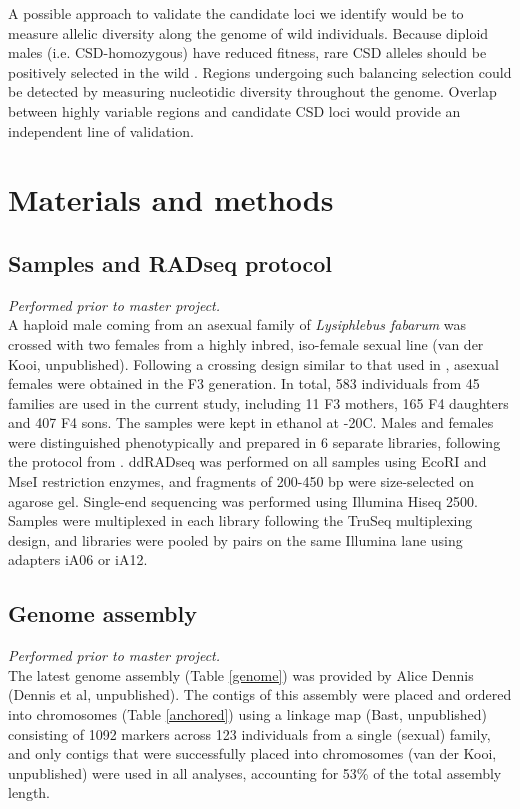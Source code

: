 \documentclass[11pt,a4paper]{report}
\begin{document}
A possible approach to validate the candidate loci we identify would be to measure allelic diversity along the genome of wild individuals. Because diploid males (i.e. CSD-homozygous) have reduced fitness, rare CSD alleles should be positively selected in the wild \citep{Hasselmann2004SignaturesBee., Gloag2016}. Regions undergoing such balancing selection could be detected by measuring nucleotidic diversity throughout the genome. Overlap between highly variable regions and candidate CSD loci would provide an independent line of validation. 

\section{Materials and methods}

\subsection{Samples and RADseq protocol}
\textit{Performed prior to master project.}\\
A haploid male coming from an asexual family of \textit{Lysiphlebus fabarum} was crossed with two females from a highly inbred, iso-female sexual line (van der Kooi, unpublished). Following a crossing design similar to that used in \citet{Sandrock2011}, asexual females were obtained in the F3 generation. In total, 583 individuals from 45 families are used in the current study, including 11 F3 mothers, 165 F4 daughters and 407 F4 sons. The samples were kept in ethanol at -20\degree C. Males and females were distinguished phenotypically and prepared in 6 separate libraries, following the protocol from \citet{Parchman2012Genome-widePine}. ddRADseq was performed on all samples using EcoRI and MseI restriction enzymes, and fragments  of 200-450 bp were size-selected on agarose gel. Single-end sequencing was performed using Illumina Hiseq 2500. Samples were multiplexed in each library following the TruSeq multiplexing design, and libraries were pooled by pairs on the same Illumina lane using adapters iA06 or iA12.

\subsection{Genome assembly}
\textit{Performed prior to master project.}\\
The latest genome assembly (Table \ref{genome}) was provided by Alice Dennis (Dennis et al, unpublished). The contigs of this assembly were placed and ordered into chromosomes (Table \ref{anchored}) using a linkage map (Bast, unpublished) consisting of 1092 markers across 123 individuals from a single (sexual) family, and only contigs that were successfully placed into chromosomes (van der Kooi, unpublished) were used in all analyses, accounting for 53\% of the total assembly length.
\end{document}
